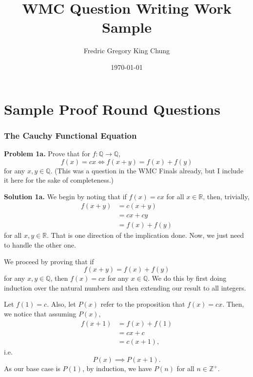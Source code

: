 \documentclass{article}
\title{WMC Question Writing Work Sample}
\author{Fredric Gregory King Chung}
\date{\today}
\begin{document}
\maketitle

\part{Sample Proof Round Questions}

\section{The Cauchy Functional Equation}

\textbf{Problem 1a.} Prove that for $f \colon \mathbb{Q} \rightarrow \mathbb{Q}$,
\[
    f(x) = cx \iff f(x + y) = f(x) + f(y)
\]
for any $x, y \in \mathbb{Q}$. (This was a question in the WMC Finals already, but I include it here for the sake of completeness.)

\bigskip

\noindent\textbf{Solution 1a.} We begin by noting that if $f(x) = cx$ for all $x \in \mathbb{R}$, then, trivially,
\begin{equation*}
    \begin{split}
        f(x + y) & = c(x + y) \\
        &= cx + cy \\
        &= f(x) + f(y)
    \end{split}
\end{equation*}
for all $x, y \in \mathbb{R}$. That is one direction of the implication done. Now, we just need to handle the other one.

\bigskip

We proceed by proving that if 
\[
    f(x + y) = f(x) + f(y)
\] 
for any $x, y \in \mathbb{Q}$, then $f(x) = cx$ for any $x \in \mathbb{Q}$. We do this by first doing induction over the natural numbers and then extending our result to all integers.

\bigskip

Let $f(1) = c$. Also, let $P(x)$ refer to the proposition that $f(x) = cx$. Then, we notice that assuming $P(x)$,
\begin{equation*}
    \begin{split}
        f(x + 1) & = f(x) + f(1) \\
        &= cx + c \\
        &= c(x + 1) \text{,}
    \end{split}
\end{equation*}
i.e.
\[
    P(x) \implies P(x + 1) \text{.}
\]
As our base case is $P(1)$, by induction, we have $P(n)$ for all $n \in \mathbb{Z^+}$.
\end{document}
